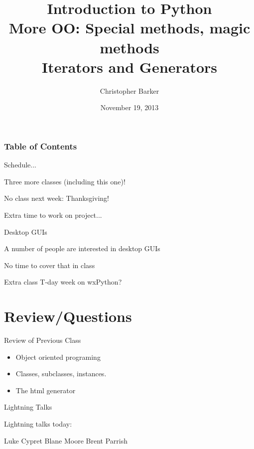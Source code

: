 \documentclass{beamer}
\title[Intro to Python: Week 8]{Introduction  to Python\\
More OO: Special methods, magic methods\\
Iterators and Generators}
\author{Christopher Barker}
\institute{UW Continuing Education}
\date{November 19, 2013}
\begin{document}
\begin{frame}
  \titlepage
\end{frame}

\begin{frame}
\frametitle{Table of Contents}
  \tableofcontents
\end{frame}

\begin{frame}{Schedule...}

\vfill
{\Large Three more classes (including this one)!}

\vfill
{\Large No class next week: Thanksgiving!}

\vfill
{\Large Extra time to work on project...}

\end{frame}

\begin{frame}{Desktop GUIs}

\vfill
{\Large A number of people are interested in desktop GUIs}

\vfill
{\Large No time to cover that in class}

\vfill
{\Large Extra class T-day week on wxPython?}

\end{frame}


\section{Review/Questions}

\begin{frame}{Review of Previous Class}

\begin{itemize}
  \item Object oriented programing
  \item Classes, subclasses, instances.
  \item The html generator
\end{itemize}

\end{frame}


\begin{frame}{Lightning Talks}

\vfill
{\LARGE Lightning talks today:}

\vfill
{\Large
Luke Cypret
\vfill
Blane Moore
\vfill
Brent Parrish
\vfill
}

\vfill

\end{frame}
\end{document}
